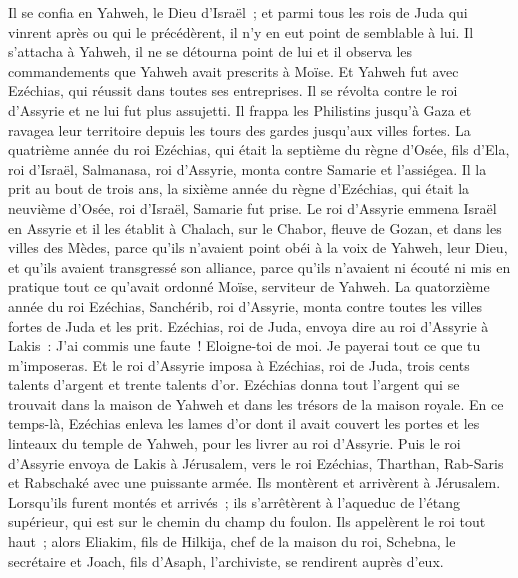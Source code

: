 \begin{multicols}{2}
Il se confia en Yahweh, le Dieu d'Israël~; et parmi tous les rois de Juda qui vinrent après ou qui le précédèrent, il n'y en eut point de semblable à lui.
Il s'attacha à Yahweh, il ne se détourna point de lui et il observa les commandements que Yahweh avait prescrits à Moïse.
Et Yahweh fut avec Ezéchias, qui réussit dans toutes ses entreprises. Il se révolta contre le roi d'Assyrie et ne lui fut plus assujetti.
Il frappa les Philistins jusqu'à Gaza et ravagea leur territoire depuis les tours des gardes jusqu'aux villes fortes.
La quatrième année du roi Ezéchias, qui était la septième du règne d'Osée, fils d'Ela, roi d'Israël, Salmanasa, roi d'Assyrie, monta contre Samarie et l'assiégea.
Il la prit au bout de trois ans, la sixième année du règne d'Ezéchias, qui était la neuvième d'Osée, roi d'Israël, Samarie fut prise.
Le roi d'Assyrie emmena Israël en Assyrie et il les établit à Chalach, sur le Chabor, fleuve de Gozan, et dans les villes des Mèdes,
parce qu'ils n'avaient point obéi à la voix de Yahweh, leur Dieu, et qu'ils avaient transgressé son alliance, parce qu'ils n'avaient ni écouté ni mis en pratique tout ce qu'avait ordonné Moïse, serviteur de Yahweh.
La quatorzième année du roi Ezéchias, Sanchérib, roi d'Assyrie, monta contre toutes les villes fortes de Juda et les prit.
Ezéchias, roi de Juda, envoya dire au roi d'Assyrie à Lakis~: J'ai commis une faute~! Eloigne-toi de moi. Je payerai tout ce que tu m'imposeras. Et le roi d'Assyrie imposa à Ezéchias, roi de Juda, trois cents talents d'argent et trente talents d'or.
Ezéchias donna tout l'argent qui se trouvait dans la maison de Yahweh et dans les trésors de la maison royale.
En ce temps-là, Ezéchias enleva les lames d'or dont il avait couvert les portes et les linteaux du temple de Yahweh, pour les livrer au roi d'Assyrie.
Puis le roi d'Assyrie envoya de Lakis à Jérusalem, vers le roi Ezéchias, Tharthan, Rab-Saris et Rabschaké avec une puissante armée. Ils montèrent et arrivèrent à Jérusalem. Lorsqu'ils furent montés et arrivés~; ils s'arrêtèrent à l'aqueduc de l'étang supérieur, qui est sur le chemin du champ du foulon.
Ils appelèrent le roi tout haut~; alors Eliakim, fils de Hilkija, chef de la maison du roi, Schebna, le secrétaire et Joach, fils d'Asaph, l'archiviste, se rendirent auprès d'eux.

\end{multicols}
